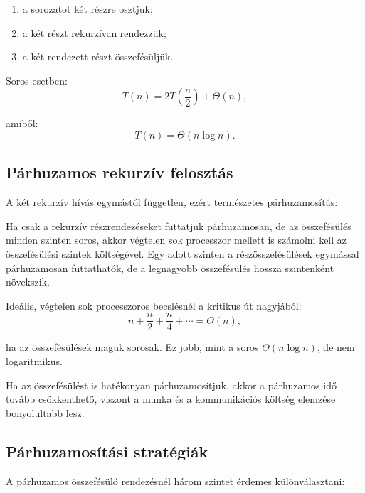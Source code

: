 \begin{enumerate}
  \item a sorozatot két részre osztjuk;
  \item a két részt rekurzívan rendezzük;
  \item a két rendezett részt összefésüljük.
\end{enumerate}

Soros esetben:
\[
  T(n)=2T\left(\frac{n}{2}\right)+\Theta(n),
\]

amiből:
\[
  T(n)=\Theta(n\log n).
\]

\subsection{Párhuzamos rekurzív felosztás}

A két rekurzív hívás egymástól független, ezért természetes párhuzamosítás:




Ha csak a rekurzív részrendezéseket futtatjuk párhuzamosan, de az összefésülés minden szinten soros, akkor végtelen sok processzor mellett is számolni kell az összefésülési szintek költségével. Egy adott szinten a részösszefésülések egymással párhuzamosan futtathatók, de a legnagyobb összefésülés hossza szintenként növekszik.

Ideális, végtelen sok processzoros becslésnél a kritikus út nagyjából:
\[
  n + \frac{n}{2}+\frac{n}{4}+\cdots = \Theta(n),
\]

ha az összefésülések maguk sorosak. Ez jobb, mint a soros $\Theta(n\log n)$, de nem logaritmikus.

Ha az összefésülést is hatékonyan párhuzamosítjuk, akkor a párhuzamos idő tovább csökkenthető, viszont a munka és a kommunikációs költség elemzése bonyolultabb lesz.

\subsection{Párhuzamosítási stratégiák}

\begin{center}

\end{center}

A párhuzamos összefésülő rendezésnél három szintet érdemes különválasztani:

